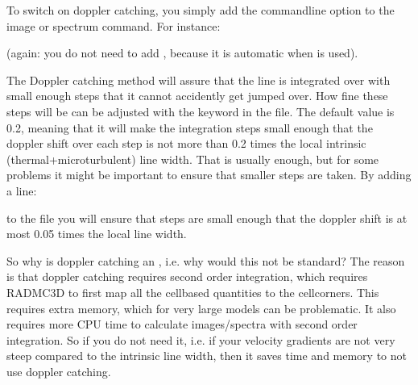\documentclass[letterpaper,10pt,english]{sphinxmanual}
\begin{document}
To switch on doppler catching, you simply add the command\sphinxhyphen{}line option
 to the image or spectrum command. For instance:

\begin{sphinxVerbatim}[commandchars=\\\{\}]
      
\end{sphinxVerbatim}

(again: you do not need to add , because it is automatic when
 is used).

The Doppler catching method will assure that the line is integrated over with
small enough steps that it cannot accidently get jumped over. How fine these
steps will be can be adjusted with the  keyword in
the  file. The default value is 0.2, meaning that it will make
the integration steps small enough that the doppler shift over each step is not
more than 0.2 times the local intrinsic (thermal+microturbulent) line
width. That is usually enough, but for some problems it might be important to
ensure that smaller steps are taken. By adding a line:

\begin{sphinxVerbatim}[commandchars=\\\{\}]
  
\end{sphinxVerbatim}

to the  file you will ensure that steps are small
enough that the doppler shift is at most 0.05 times the local line width.

So why is doppler catching an , i.e. why would this not be standard?
The reason is that doppler catching requires second order integration, which
requires RADMC\sphinxhyphen{}3D to first map all the cell\sphinxhyphen{}based quantities to the
cell\sphinxhyphen{}corners. This requires extra memory, which for very large models can be
problematic. It also requires more CPU time to calculate images/spectra with
second order integration. So if you do not need it, i.e. if your velocity
gradients are not very steep compared to the intrinsic line width, then it saves
time and memory to not use doppler catching.
\end{document}
